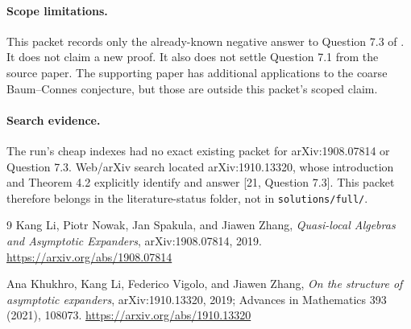 \documentclass[11pt]{article}
\begin{document}
\paragraph{Scope limitations.}
This packet records only the already-known negative answer to Question 7.3 of
\cite{LNSZ}. It does not claim a new proof. It also does not settle Question 7.1
from the source paper. The supporting paper has additional applications to the
coarse Baum--Connes conjecture, but those are outside this packet's scoped
claim.

\paragraph{Search evidence.}
The run's cheap indexes had no exact existing packet for arXiv:1908.07814 or
Question 7.3. Web/arXiv search located arXiv:1910.13320, whose introduction and
Theorem 4.2 explicitly identify and answer [21, Question 7.3]. This packet
therefore belongs in the literature-status folder, not in \texttt{solutions/full/}.

\begin{thebibliography}{9}
Kang Li, Piotr Nowak, Jan Spakula, and Jiawen Zhang,
\emph{Quasi-local Algebras and Asymptotic Expanders},
arXiv:1908.07814, 2019. \url{https://arxiv.org/abs/1908.07814}

Ana Khukhro, Kang Li, Federico Vigolo, and Jiawen Zhang,
\emph{On the structure of asymptotic expanders},
arXiv:1910.13320, 2019; Advances in Mathematics 393 (2021), 108073.
\url{https://arxiv.org/abs/1910.13320}
\end{thebibliography}
\end{document}
